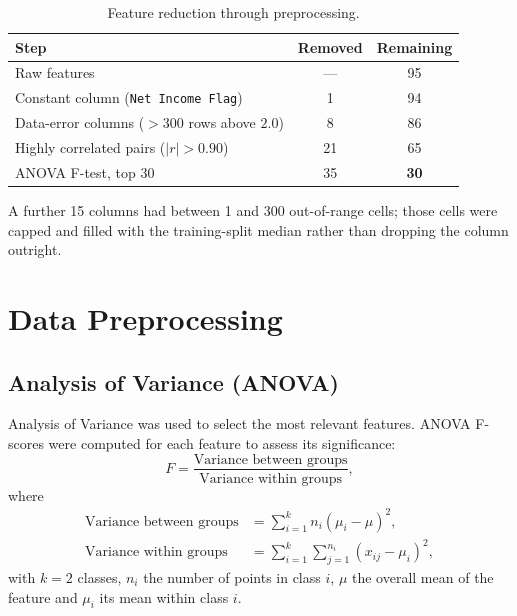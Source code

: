 \documentclass[11pt]{article}
\begin{document}
\begin{table}[H]
    \centering
    \small
    \caption{Feature reduction through preprocessing.}
    \label{tab:preproc}
    \begin{tabular}{lcc}
        \toprule
        \textbf{Step} & \textbf{Removed} & \textbf{Remaining} \\
        \midrule
        Raw features                                   & --- & 95 \\
        Constant column (\texttt{Net Income Flag})     & 1   & 94 \\
        Data-error columns ($>300$ rows above $2.0$)   & 8   & 86 \\
        Highly correlated pairs ($|r| > 0.90$)         & 21  & 65 \\
        ANOVA F-test, top 30                           & 35  & \textbf{30} \\
        \bottomrule
    \end{tabular}
\end{table}

A further 15 columns had between 1 and 300 out-of-range cells; those cells were
capped and filled with the training-split median rather than dropping the
column outright.

\section{Data Preprocessing}

\subsection{Analysis of Variance (ANOVA)}

Analysis of Variance was used to select the most relevant features. ANOVA
F-scores were computed for each feature to assess its significance:
\begin{equation}
    F = \frac{\text{Variance between groups}}{\text{Variance within groups}},
\end{equation}
where
\begin{align}
    \text{Variance between groups} &= \sum_{i=1}^{k} n_i (\mu_i - \mu)^2, \\
    \text{Variance within groups}  &= \sum_{i=1}^{k} \sum_{j=1}^{n_i} (x_{ij} - \mu_i)^2,
\end{align}
with $k=2$ classes, $n_i$ the number of points in class $i$, $\mu$ the overall
mean of the feature and $\mu_i$ its mean within class $i$.
\end{document}
